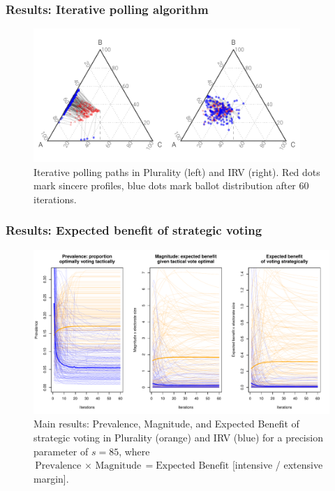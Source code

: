 \documentclass[10pt, en-GB]{beamer}
\begin{document}
\begin{frame}[t]\frametitle{Results: Iterative polling algorithm}
    
\begin{figure}
\includegraphics[width = 0.9\textwidth]{pres_fig/tatonnement_both}
\caption{Iterative polling paths in Plurality (left) and IRV (right). Red dots mark sincere profiles, blue dots mark ballot distribution after 60 iterations.}
\end{figure}

\end{frame}

\begin{frame}[t]\frametitle{Results: Expected benefit of strategic voting}
    
\begin{figure}
\includegraphics[width = .9\textwidth]{pres_fig/results_85} 
\caption{Main results: Prevalence, Magnitude, and Expected Benefit of strategic voting in Plurality (orange) and IRV (blue) for a precision parameter of $s = 85$, where $\text{Prevalence $\times$ Magnitude} = \text{Expected Benefit}$ [intensive / extensive margin].}
\end{figure}
\end{frame}
\end{document}
